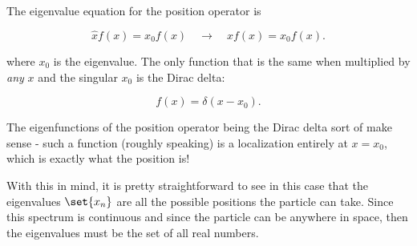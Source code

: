 \section{}

The eigenvalue equation for the position operator is

\begin{equation}
    \hat{x}f(x) = x_0f(x) \quad\rightarrow\quad xf(x) = x_0f(x).
\end{equation}

where $x_0$ is the eigenvalue. The only function that is the same when multiplied by \textit{any} $x$ and the singular $x_0$ is the Dirac delta:

\begin{equation}
    f(x) = \delta(x - x_0).
\end{equation}

The eigenfunctions of the position operator being the Dirac delta sort of make sense - such a function (roughly speaking) is a localization entirely at $x=x_0$, which is exactly what the position is!

With this in mind, it is pretty straightforward to see in this case that the eigenvalues $\set{x_n}$ are all the possible positions the particle can take. Since this spectrum is continuous and since the particle can be anywhere in space, then the eigenvalues must be the set of all real numbers.